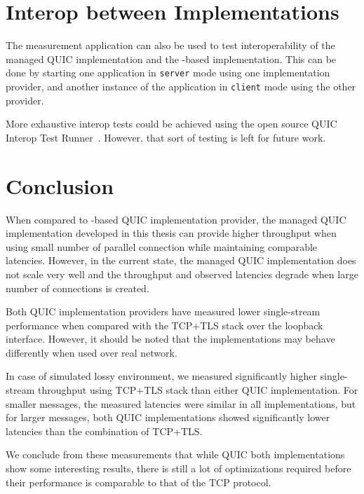 \section{Interop between Implementations}

The measurement application can also be used to test interoperability of the managed QUIC
implementation and the \libmsquic{}-based implementation. This can be done by starting one
application in \texttt{server} mode using one implementation provider, and another instance of the
application in \texttt{client} mode using the other provider.

More exhaustive interop tests could be achieved using the open source QUIC Interop Test
Runner~\cite{QuicInteropRunner}. However, that sort of testing is left for future work.

\section{Conclusion}

When compared to \libmsquic{}-based QUIC implementation provider, the managed QUIC implementation
developed in this thesis can provide higher throughput when using small number of parallel
connection while maintaining comparable latencies. However, in the current state, the managed QUIC
implementation does not scale very well and the throughput and observed latencies degrade when large
number of connections is created.

Both QUIC implementation providers have measured lower single-stream performance when compared with
the TCP+TLS stack over the loopback interface. However, it should be noted that the implementations
may behave differently when used over real network.

In case of simulated lossy environment, we measured significantly higher single-stream throughput
using TCP+TLS stack than either QUIC implementation. For smaller messages, the measured latencies
were similar in all implementations, but for larger messages, both QUIC implementations showed
significantly lower latencies than the combination of TCP+TLS.

We conclude from these measurements that while QUIC both implementations show some interesting
results, there is still a lot of optimizations required before their performance is comparable to
that of the TCP protocol.
